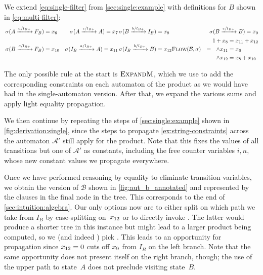 We extend \cref{eq:single-filter} from \cref{sec:single:example} with
definitions for $B$ shown in \cref{eq:multi-filter}:
\begin{equation}\label{eq:multi-filter}
    \begin{aligned}
        & \operatorname{\sigma}(A \xrightarrow{a / l_{B+}} F_B ) = x_6 
        & \operatorname{\sigma}(A \xrightarrow{c / l_{B+}} A ) = x_7 
        & \operatorname{\sigma}(B \xrightarrow{b / l_{B+}} I_B) = x_8 
        &\operatorname{\sigma}(B \xrightarrow{c / l_{B+}} B) = x_9  \\
        & \operatorname{\sigma}(B \xrightarrow{c / l_{B+}} F_B)= x_{10}
        & \operatorname{\sigma}(I_B \xrightarrow{a / l_{B+}} A)= x_{11}
        & \operatorname{\sigma}(I_B \xrightarrow{b / l_{B+}} B)= x_{12}
        \textsc{Flow}(\mathcal{B}, \operatorname{\sigma}) &=  \begin{aligned}
            1 + x_{8}   &= x_{11} + x_{12}\\
            \land x_{11} &= x_6\\
            \land x_{12} &= x_8 + x_{10}
        \end{aligned}
    \end{aligned}
\end{equation}

The only possible rule at the start is $\textsc{ExpandM}$, which we use to add the
corresponding constraints on each automaton of the product as we would have had
in the single-automaton version. After that, we expand the various sums and apply
light equality propagation.

We then continue by repeating the steps of \cref{sec:single:example} shown in
\cref{fig:derivation:single}, since the steps to propagate
\cref{ex:string-constraints} across the automaton $\mathcal{A}'$ still apply for the
product. Note that this fixes the values of all transitions but one of $\mathcal{A}'$ as
constants, including the free counter variables $i, n$, whose new constant
values we propagate everywhere.

Once we have performed reasoning by equality to eliminate transition variables,
we obtain the version of $\mathcal{B}$ shown in \cref{fig:aut_b_annotated} and represented
by the clauses in the final node in the tree. This corresponds to the end of
\cref{sec:intuition:algebra}. Our only options now are to either split on which
path we take from $I_B$ by case-splitting on~$x_{12}$ or to
directly invoke \Materialise{}. The latter would produce a shorter tree in this
instance but might lead to a larger product being computed, so we (and indeed
\Catra{}) pick \Split{}. This leads to an opportunity for propagation since
$x_{12} = 0$ cuts off $x_{9}$ from $I_B$ on the left
branch. Note that the same opportunity does not present itself on the right
branch, though; the use of the upper path to state~$A$ does not preclude visiting
state~$B$.

